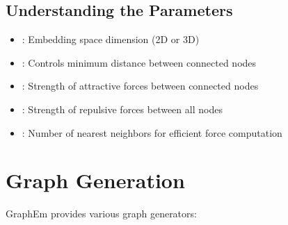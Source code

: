 \documentclass[letterpaper,10pt,english]{sphinxmanual}
\begin{document}
\subsection{Understanding the Parameters}
\label{\detokenize{quickstart:understanding-the-parameters}}\begin{itemize}
\item {} 
\sphinxAtStartPar
{}: Embedding space dimension (2D or 3D)

\item {} 
\sphinxAtStartPar
{}: Controls minimum distance between connected nodes

\item {} 
\sphinxAtStartPar
{}: Strength of attractive forces between connected nodes

\item {} 
\sphinxAtStartPar
{}: Strength of repulsive forces between all nodes

\item {} 
\sphinxAtStartPar
{}: Number of nearest neighbors for efficient force computation

\end{itemize}


\section{Graph Generation}
\label{\detokenize{quickstart:graph-generation}}
\sphinxAtStartPar
GraphEm provides various graph generators:

\begin{sphinxVerbatim}[commandchars=\\\{\}]
   

    

     

   
\end{sphinxVerbatim}
\end{document}
